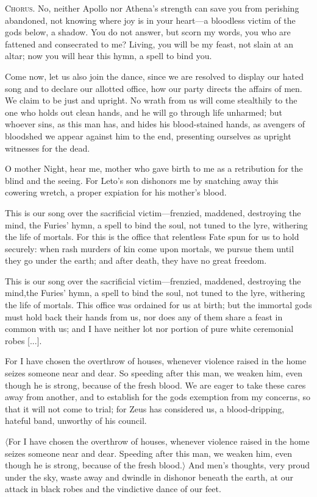 \documentclass[12pt]{article}
\begin{document}
\textsc{Chorus.} No, neither Apollo nor Athena's strength can save you from perishing abandoned, not knowing where joy is in your heart---a bloodless victim of the gods below, a shadow. You do not answer, but scorn my words, you who are fattened and consecrated to me? Living, you will be my feast, not slain at an altar; now you will hear this hymn, a spell to bind you.

Come now, let us also join the dance, since we are resolved to display our hated song and to declare our allotted office, how our party directs the affairs of men. We claim to be just and upright. No wrath from us will come stealthily to the one who holds out clean hands, and he will go through life unharmed; but whoever sins, as this man has, and hides his blood-stained hands, as avengers of bloodshed we appear against him to the end, presenting ourselves as upright witnesses for the dead.

O mother Night, hear me, mother who gave birth to me as a retribution for the blind and the seeing. For Leto's son dishonors me by snatching away this cowering wretch, a proper expiation for his mother's blood.

This is our song over the sacrificial victim---frenzied, maddened, destroying the mind, the Furies' hymn, a spell to bind the soul, not tuned to the lyre, withering the life of mortals. For this is the office that relentless Fate spun for us to hold securely: when rash murders of kin come upon mortals, we pursue them until they go under the earth; and after death, they have no great freedom.

This is our song over the sacrificial victim---frenzied, maddened, destroying the mind,the Furies' hymn, a spell to bind the soul, not tuned to the lyre, withering the life of mortals. This office was ordained for us at birth; but the immortal gods must hold back their hands from us, nor does any of them share a feast in common with us; and I have neither lot nor portion of pure white ceremonial robes [...].

For I have chosen the overthrow of houses, whenever violence raised in the home seizes someone near and dear. So speeding after this man, we weaken him, even though he is strong, because of the fresh blood. We are eager to take these cares away from another, and to establish for the gods exemption from my concerns, so that it will not come to trial; for Zeus has considered us, a blood-dripping, hateful band, unworthy of his council.

$\langle$For I have chosen the overthrow of houses, whenever violence raised in the home seizes someone near and dear. Speeding after this man, we weaken him, even though he is strong, because of the fresh blood.$\rangle$ And men's thoughts, very proud under the sky, waste away and dwindle in dishonor beneath the earth, at our attack in black robes and the vindictive dance of our feet.
\end{document}
